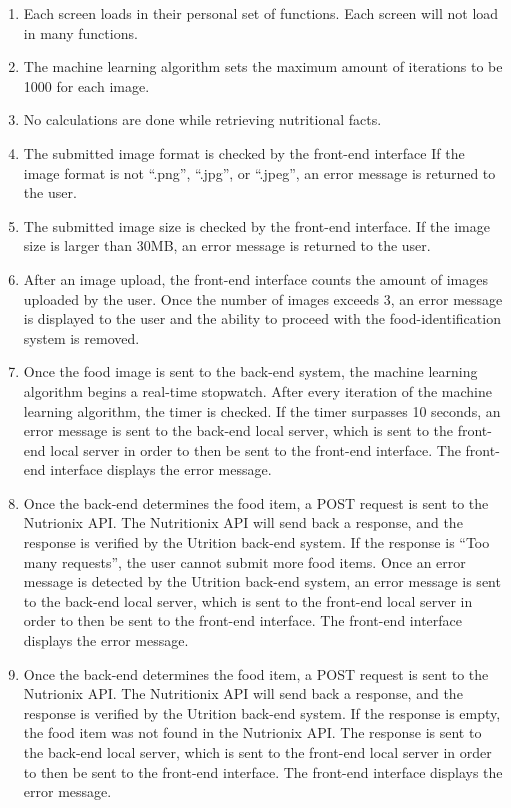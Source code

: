 \documentclass[12pt, titlepage]{article}
\begin{document}
\begin{enumerate}[{PR}1. ]
	\item Each screen loads in their personal set of functions. Each screen will not load in many functions.
	\item The machine learning algorithm sets the maximum amount of iterations to be 1000 for each image.
	\item No calculations are done while retrieving nutritional facts.
	\item The submitted image format is checked by the front-end interface If the image format is not “.png”, “.jpg”, or “.jpeg”, an error message is returned to the user.
	\item The submitted image size is checked by the front-end interface. If the image size is larger than 30MB, an error message is returned to the user.
	\item After an image upload, the front-end interface counts the amount of images uploaded by the user. Once the number of images exceeds 3, an error message is displayed to the user and the ability to proceed with the food-identification system is removed.
	\item Once the food image is sent to the back-end system, the machine learning algorithm begins a real-time stopwatch. After every iteration of the machine learning algorithm, the timer is checked. If the timer surpasses 10 seconds, an error message is sent to the back-end local server, which is sent to the front-end local server in order to then be sent to the front-end interface. The front-end interface displays the error message.
	\item Once the back-end determines the food item, a POST request is sent to the Nutrionix API. The Nutritionix API will send back a response, and the response is verified by the Utrition back-end system. If the response is “Too many requests”, the user cannot submit more food items. Once an error message is detected by the Utrition back-end system, an error message is sent to the back-end local server, which is sent to the front-end local server in order to then be sent to the front-end interface. The front-end interface displays the error message.
	\item Once the back-end determines the food item, a POST request is sent to the Nutrionix API. The Nutritionix API will send back a response, and the response is verified by the Utrition back-end system. If the response is empty, the food item was not found in the Nutrionix API. The response is sent to the back-end local server, which is sent to the front-end local server in order to then be sent to the front-end interface. The front-end interface displays the error message.

\end{enumerate}
\end{document}
